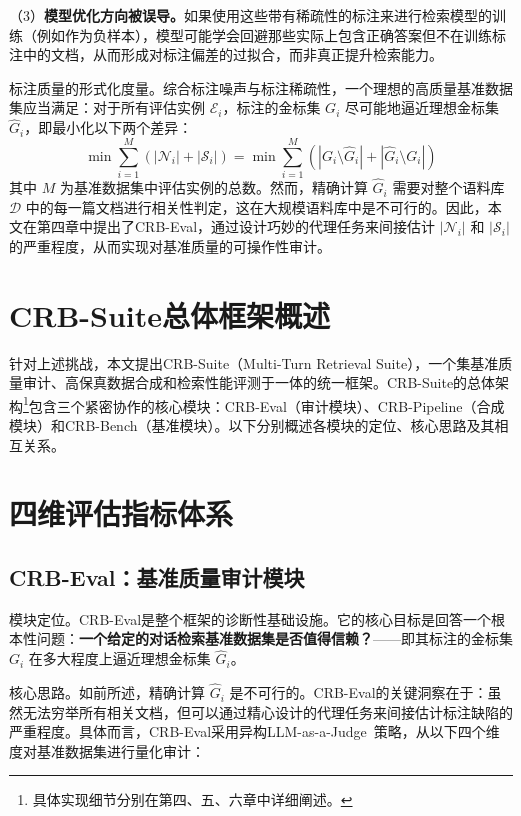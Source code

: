 （3）\textbf{模型优化方向被误导。}如果使用这些带有稀疏性的标注来进行检索模型的训练（例如作为负样本），模型可能学会回避那些实际上包含正确答案但不在训练标注中的文档，从而形成对标注偏差的过拟合，而非真正提升检索能力。


标注质量的形式化度量。综合标注噪声与标注稀疏性，一个理想的高质量基准数据集应当满足：对于所有评估实例 $\mathcal{E}_i$，标注的金标集 $G_i$ 尽可能地逼近理想金标集 $\hat{G}_i$，即最小化以下两个差异：
\begin{equation}
    \min \sum_{i=1}^{M} \left( |\mathcal{N}_i| + |\mathcal{S}_i| \right) = \min \sum_{i=1}^{M} \left( |G_i \setminus \hat{G}_i| + |\hat{G}_i \setminus G_i| \right)
\end{equation}
其中 $M$ 为基准数据集中评估实例的总数。然而，精确计算 $\hat{G}_i$ 需要对整个语料库 $\mathcal{D}$ 中的每一篇文档进行相关性判定，这在大规模语料库中是不可行的。因此，本文在第四章中提出了CRB-Eval，通过设计巧妙的代理任务来间接估计 $|\mathcal{N}_i|$ 和 $|\mathcal{S}_i|$ 的严重程度，从而实现对基准质量的可操作性审计。




\section{CRB-Suite总体框架概述}
\label{sec:framework_overview}

针对上述挑战，本文提出CRB-Suite（Multi-Turn Retrieval Suite），一个集基准质量审计、高保真数据合成和检索性能评测于一体的统一框架。CRB-Suite的总体架构\footnote{具体实现细节分别在第四、五、六章中详细阐述。}包含三个紧密协作的核心模块：CRB-Eval（审计模块）、CRB-Pipeline（合成模块）和CRB-Bench（基准模块）。以下分别概述各模块的定位、核心思路及其相互关系。





\section{四维评估指标体系}

\subsection{CRB-Eval：基准质量审计模块}

模块定位。CRB-Eval是整个框架的诊断性基础设施。它的核心目标是回答一个根本性问题：\textbf{一个给定的对话检索基准数据集是否值得信赖？}——即其标注的金标集 $G_i$ 在多大程度上逼近理想金标集 $\hat{G}_i$。

核心思路。如前所述，精确计算 $\hat{G}_i$ 是不可行的。CRB-Eval的关键洞察在于：虽然无法穷举所有相关文档，但可以通过精心设计的代理任务来间接估计标注缺陷的严重程度。具体而言，CRB-Eval采用异构LLM-as-a-Judge~\citep{zheng2023judging}策略，从以下四个维度对基准数据集进行量化审计：

